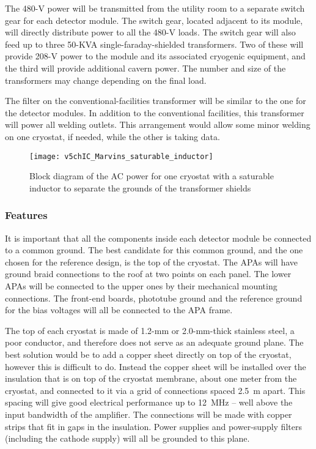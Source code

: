 The 480-V power will be transmitted from the utility room to a separate switch gear for each detector module. The switch gear, located adjacent to its module, will directly distribute power to all the 480-V loads. The switch gear will also feed up to three 50-KVA single-faraday-shielded transformers.  Two of these will provide 208-V power to the module and its associated cryogenic equipment, and the third will provide additional cavern power.  The number and size of the transformers may change depending on the final load. 

The filter on the conventional-facilities transformer will be similar to the one for the detector modules.  In addition to the conventional facilities, this transformer will power all welding outlets.  This arrangement would allow some minor welding on one cryostat, if needed, while the other is taking data. 

\begin{figure}[htpb]
\centering
\texttt{[image: v5chIC\_Marvins\_saturable\_inductor]}
\caption[Block diagram of the AC power for one cryostat]{Block diagram of the AC power for one cryostat with a saturable inductor to separate the grounds of the transformer shields}
\label{fig:Saturable_inductor}
\end{figure}

\subsubsection{Features}

It is important that all the components inside each detector module be connected to a common ground.  The  best candidate for this common ground, and the one chosen for the reference design, is the top of the cryostat.  The APAs will have ground braid connections to the roof at two points on each panel.  The lower APAs will be connected to the upper ones by their mechanical mounting connections.  The front-end boards, phototube ground and the reference ground for the bias voltages will all be connected to the APA frame.

The top of each cryostat is made of 1.2-mm or 2.0-mm-thick stainless steel, a poor conductor, and therefore does not serve as an adequate ground plane.  The best solution would be to add a copper sheet directly on top of the cryostat, however this is difficult to do. Instead the copper sheet will be installed over the insulation that is on top of the cryostat membrane, about one meter from the cryostat, and connected to it via a grid of connections spaced 2.5~m apart.  This spacing will give good electrical performance up to 12~MHz -- well above the input bandwidth of the amplifier. The connections will be made with copper strips that fit in gaps in the insulation. Power supplies and power-supply filters (including the cathode supply) will all be grounded to this plane.

